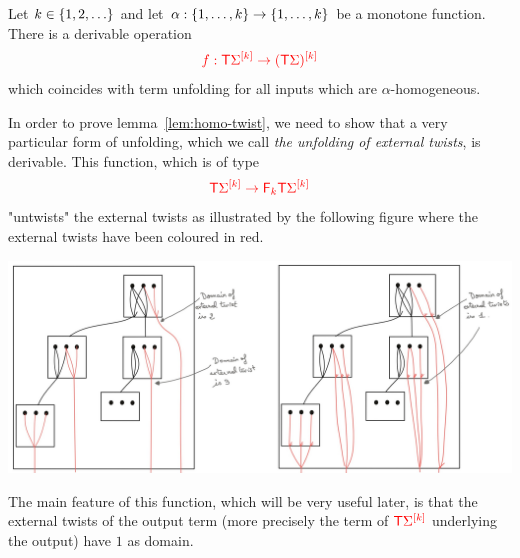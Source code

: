 \begin{lemma}\label{lem:homo-twist}
    Let $k \in \set{1,2,\ldots}$ and let $\alpha : \set{1,\ldots,k} \to \set{1,\ldots,k}$ be a monotone function. There is a derivable operation 
    \begin{align*}
        \ranked{f : \tmonad \mati k \rSigma \to \mati k {(\tmonad \Sigma)} }
        \end{align*}      
which coincides with term unfolding for all inputs which are $\alpha$-homogeneous.
\end{lemma}

In order to prove lemma~\ref{lem:homo-twist}, we need to show that a very particular form of unfolding, which we call \emph{the unfolding of external twists}, is derivable. This function, which is of type 
\begin{align*}
\ranked{\tmonad \mati k \Sigma \to \reduce k \tmonad \mati k \Sigma}
\end{align*}
"untwists" the external twists  as illustrated by the following figure where the external twists have been coloured in red. 
\begin{center}
\includegraphics[scale=.15]{MyPicExternalTwists.jpg}
\end{center}
The main feature of this function, which will be very useful later, is that the external twists of the output term (more precisely the term of $\ranked{\tmonad \mati k \Sigma}$ underlying the output) have $1$ as domain.  

